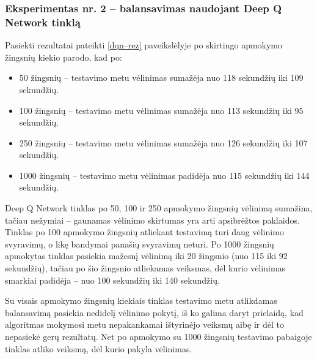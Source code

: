 \documentclass{VUMIFPSbakalaurinis}
\begin{document}
\subsubsection{Eksperimentas nr. 2 – balansavimas naudojant Deep Q Network tinklą}
Pasiekti rezultatai pateikti \ref{dqn–rez} paveikslėlyje po skirtingo apmokymo žingsnių kiekio parodo, kad po:
\begin{itemize}
    \item 50 žingsnių – testavimo metu vėlinimas sumažėja nuo 118 sekundžių iki 109 sekundžių. 
    \item 100 žingsnių – testavimo metu vėlinimas sumažėja nuo 113 sekundžių iki 95 sekundžių.
    \item 250 žingsnių – testavimo metu vėlinimas sumažėja nuo 126 sekundžių iki 107 sekundžių.
    \item 1000 žingsnių – testavimo metu vėlinimas padidėja nuo 115 sekundžių iki 144 sekundžių.
\end{itemize}
Deep Q Network tinklas po 50, 100 ir 250 apmokymo žingsnių vėlinimą sumažina, tačiau nežymiai – gaunamas vėlinimo skirtumas yra arti apsibrėžtos paklaidos. Tinklas po 100 apmokymo žingsnių atliekant testavimą turi daug vėlinimo svyravimų, o likę bandymai panašių svyravimų neturi. Po 1000 žingsnių apmokytas tinklas pasiekia mažesnį vėlinimą iki 20 žingsnio (nuo 115 iki 92 sekundžių), tačiau po šio žingsnio atliekamas veiksmas, dėl kurio vėlinimas smarkiai padidėja – nuo 100 sekundžių iki 140 sekundžių.

Su visais apmokymo žingsnių kiekiais tinklas testavimo metu atlikdamas balansavimą pasiekia nedidelį vėlinimo pokytį,  iš ko galima daryt prielaidą, kad algoritmas mokymosi metu nepakankamai ištyrinėjo veiksmų aibę ir dėl to nepasiekė gerų rezultatų. Net po apmokymo su 1000 žingsnių testavimo pabaigoje tinklas atliko veiksmą, dėl kurio pakyla vėlinimas.
\end{document}
